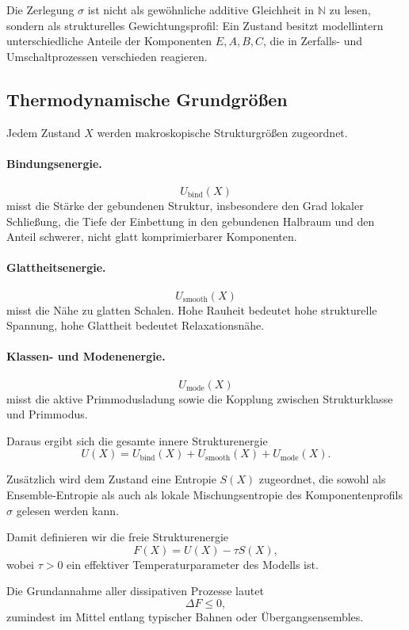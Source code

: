\documentclass[11pt,a4paper]{article}
\theoremstyle{definition}
\begin{document}
Die Zerlegung $\sigma$ ist nicht als gewöhnliche additive Gleichheit in $\mathbb{N}$ zu lesen, sondern als strukturelles Gewichtungsprofil: Ein Zustand besitzt modellintern unterschiedliche Anteile der Komponenten $E,A,B,C$, die in Zerfalls- und Umschaltprozessen verschieden reagieren.

\subsection{Thermodynamische Grundgrößen}

Jedem Zustand $X$ werden makroskopische Strukturgrößen zugeordnet.

\paragraph{Bindungsenergie.}
\[
U_{\mathrm{bind}}(X)
\]
misst die Stärke der gebundenen Struktur, insbesondere den Grad lokaler Schließung, die Tiefe der Einbettung in den gebundenen Halbraum und den Anteil schwerer, nicht glatt komprimierbarer Komponenten.

\paragraph{Glattheitsenergie.}
\[
U_{\mathrm{smooth}}(X)
\]
misst die Nähe zu glatten Schalen. Hohe Rauheit bedeutet hohe strukturelle Spannung, hohe Glattheit bedeutet Relaxationsnähe.

\paragraph{Klassen- und Modenenergie.}
\[
U_{\mathrm{mode}}(X)
\]
misst die aktive Primmodusladung sowie die Kopplung zwischen Strukturklasse und Primmodus.

Daraus ergibt sich die gesamte innere Strukturenergie
\[
U(X)=U_{\mathrm{bind}}(X)+U_{\mathrm{smooth}}(X)+U_{\mathrm{mode}}(X).
\]

Zusätzlich wird dem Zustand eine Entropie $S(X)$ zugeordnet, die sowohl als Ensemble-Entropie als auch als lokale Mischungsentropie des Komponentenprofils $\sigma$ gelesen werden kann.

Damit definieren wir die freie Strukturenergie
\[
F(X)=U(X)-\tau S(X),
\]
wobei $\tau>0$ ein effektiver Temperaturparameter des Modells ist.

Die Grundannahme aller dissipativen Prozesse lautet
\[
\Delta F\le 0,
\]
zumindest im Mittel entlang typischer Bahnen oder Übergangsensembles.
\end{document}
